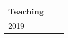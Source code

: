 \documentclass[letterpaper,10pt,oneside]{article}
\begin{document}
\begin{small}
\begin{longtable}{@{} l p{5.3in}l}
\Large{\textbf{Teaching}}  \vspace{5mm} \\
 \large{2019}

\end{longtable}
\end{small}
\end{document}
